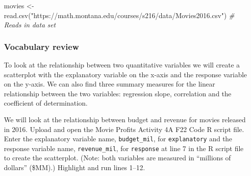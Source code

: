 \documentclass[
]{report}
\newenvironment{Shaded}{\begin{snugshade}}{\end{snugshade}}
\newcommand{\AttributeTok}[1]{\textcolor[rgb]{0.77,0.63,0.00}{#1}}
\newcommand{\CommentTok}[1]{\textcolor[rgb]{0.56,0.35,0.01}{\textit{#1}}}
\newcommand{\ConstantTok}[1]{\textcolor[rgb]{0.00,0.00,0.00}{#1}}
\newcommand{\FunctionTok}[1]{\textcolor[rgb]{0.00,0.00,0.00}{#1}}
\newcommand{\NormalTok}[1]{#1}
\newcommand{\OtherTok}[1]{\textcolor[rgb]{0.56,0.35,0.01}{#1}}
\newcommand{\SpecialCharTok}[1]{\textcolor[rgb]{0.00,0.00,0.00}{#1}}
\newcommand{\StringTok}[1]{\textcolor[rgb]{0.31,0.60,0.02}{#1}}
\begin{document}
\begin{Shaded}
\begin{Highlighting}[]
\NormalTok{movies }\OtherTok{\textless{}{-}} \FunctionTok{read.csv}\NormalTok{(}\StringTok{"https://math.montana.edu/courses/s216/data/Movies2016.csv"}\NormalTok{) }\CommentTok{\# Reads in data set }
\end{Highlighting}
\end{Shaded}

\hypertarget{vocabulary-review}{%
\subsubsection*{Vocabulary review}\label{vocabulary-review}}

To look at the relationship between two quantitative variables we will create a scatterplot with the explanatory variable on the x-axis and the response variable on the y-axis. We can also find three summary measures for the linear relationship between the two variables: regression slope, correlation and the coefficient of determination.

We will look at the relationship between budget and revenue for movies released in 2016. Upload and open the Movie Profits Activity 4A F22 Code R script file. Enter the explanatory variable name, \texttt{budget\_mil}, for \texttt{explanatory} and the response variable name, \texttt{revenue\_mil}, for \texttt{response} at line 7 in the R script file to create the scatterplot. (Note: both variables are measured in ``millions of dollars'' (\$MM).) Highlight and run lines 1--12.

\begin{Shaded}
\end{Shaded}
\end{document}
